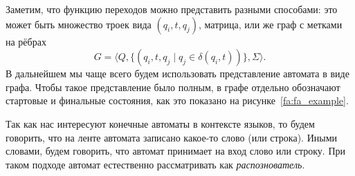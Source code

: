 Заметим, что функцию переходов можно представить разными способами: это может быть множество троек вида $(q_i, t, q_j)$, матрица, или же граф с метками на рёбрах 
\[G = \langle Q, \{(q_i,t,q_j \mid q_j \in \delta(q_i,t))\}, \Sigma \rangle.\]
В дальнейшем мы чаще всего будем использовать представление автомата в виде графа.
Чтобы такое представление было полным, в графе отдельно обозначают стартовые и финальные состояния, как это показано на рисунке~\ref{fa:fa_example}.

Так как нас интересуют конечные автоматы в контексте языков, то будем говорить, что на ленте автомата записано какое-то слово (или строка).
Иными словами, будем говорить, что автомат принимает на вход слово или строку.
При таком подходе автомат естественно рассматривать как \emph{распознователь}.

